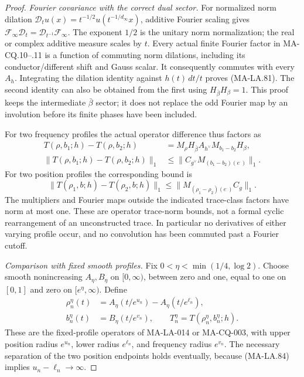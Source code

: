 \begin{proof}
\emph{Fourier covariance with the correct dual sector.}
For normalized norm dilation
\(\mathcal D_tu(x)=t^{-1/2}u(t^{-1/d_\infty}x)\),
additive Fourier scaling gives
\(\mathcal F_\infty\mathcal D_t
 =\mathcal D_{t^{-1}}\mathcal F_\infty\).
The exponent \(1/2\) is the unitary norm normalization;
the real or complex additive measure scales by \(t\).
Every actual finite Fourier factor in MA-CQ.10--.11
is a function of commuting norm dilations, including
its conductor/different shift and Gauss scalar.
It consequently commutes with every \(A_h\).
Integrating the dilation identity against \(h(t)\,dt/t\)
proves (MA-LA.81).  The second identity can also be
obtained from the first using \(H_{\bar\beta}H_\beta=1\).
This proof keeps the intermediate \(\bar\beta\) sector;
it does not replace the odd Fourier map by an involution
before its finite phases have been included.

For two frequency profiles the actual operator difference
thus factors as
\[
 \begin{split}
 T(\rho,b_1;h)-T(\rho,b_2;h)
   &=M_\rho H_{\bar\beta}
           A_{h^\vee}M_{b_1-b_2}H_\beta,\\
 \|T(\rho,b_1;h)-T(\rho,b_2;h)\|_1
   &\le\|C_{g^\vee}M_{(b_1-b_2)(e^\cdot)}\|_1 .
 \end{split}
 \tag{MA-LA.87}
\]
For two position profiles the corresponding bound is
\[
 \|T(\rho_1,b;h)-T(\rho_2,b;h)\|_1
       \le\|M_{(\rho_1-\rho_2)(e^\cdot)}C_g\|_1 .
 \tag{MA-LA.88}
\]
The multipliers and Fourier maps outside the indicated
trace-class factors have norm at most one.
These are operator trace-norm bounds, not a formal
cyclic rearrangement of an unconstructed trace.
In particular no derivatives of either varying profile
occur, and no convolution has been commuted past a
Fourier cutoff.

\emph{Comparison with fixed smooth profiles.}
Fix \(0<\eta<\min(1/4,\log2)\).
Choose smooth nonincreasing \(A_\eta,B_\eta\) on
\([0,\infty)\), between zero and one, equal to one on
\([0,1]\) and zero on \([e^\eta,\infty)\).
Define
\[
 \begin{aligned}
 \rho_n^\eta(t)
   &=A_\eta(t/e^{u_n})-A_\eta(t/e^{\ell_n}),\\
 b_n^\eta(t)&=B_\eta(t/e^{v_n}),\qquad
 T_n^\eta=T(\rho_n^\eta,b_n^\eta;h).
 \end{aligned}
 \tag{MA-LA.89}
\]
These are the fixed-profile operators of MA-LA-014 or
MA-CQ-003, with upper position radius \(e^{u_n}\),
lower radius \(e^{\ell_n}\), and frequency radius
\(e^{v_n}\).  The necessary separation of the two
position endpoints holds eventually, because
(MA-LA.84) implies \(u_n-\ell_n\to\infty\).


\end{proof}
